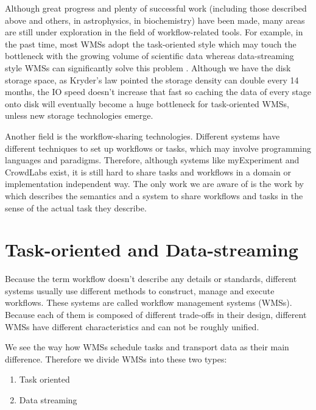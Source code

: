 Although great progress and plenty of successful work (including those described above and others, \eg \cite{berriman2007generating} \cite{berriman2010application} in astrophysics, \cite{aiche2015workflows} in biochemistry) have been made, many areas are still under exploration in the field of workflow-related tools. For example, in the past time, most WMSs adopt the task-oriented style which may touch the bottleneck with the growing volume of scientific data whereas data-streaming style WMSs can significantly solve this problem \cite{doi:10.1177/1094342016649766}. Although we have the disk storage space, as Kryder’s law \citep{Kryders_law} pointed the storage density can double every 14 months, the IO speed doesn't increase that fast so caching the data of every stage onto disk will eventually become a huge bottleneck for task-oriented WMSs, unless new storage technologies emerge.

Another field is the workflow-sharing technologies. Different systems have different techniques to set up workflows or tasks, which may involve programming languages and paradigms. Therefore, although systems like myExperiment \cite{de2008design} and CrowdLabs \cite{Mates2011} exist, it is still hard to share tasks and workflows in a domain or implementation independent way. The only work we are aware of is the work by \citeauthor{GARIJO2017271} \cite{GARIJO2017271} which describes the semantics and a system to share workflows and tasks in the sense of the actual task they describe. 

\section{Task-oriented and Data-streaming}
Because the term workflow doesn't describe any details or standards, different systems usually use different methods to construct, manage and execute workflows. These systems are called workflow management systems (WMSs). Because each of them is composed of different trade-offs in their design, different WMSs have different characteristics and can not be roughly unified.

We see the way how WMSs schedule tasks and transport data as their main difference. Therefore we divide WMSs into these two types:
\begin{enumerate}
	\item Task oriented
	\item Data streaming
\end{enumerate}

